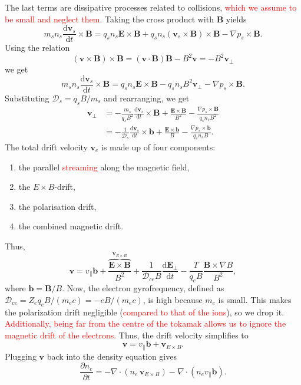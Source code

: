\documentclass[12pt]{article}
\begin{document}
%
The last terms are dissipative processes related to collisions, \textcolor{red}{which we assume to be small and neglect them}. Taking the cross product with $\bm{B}$ yields
%
\begin{equation}
    m_s n_s \frac{\mathrm{d} \bm{v}_s}{\mathrm{d} t} \times \bm{B} = q_s n_s \bm{E} \times \bm{B} + q_s n_s (\bm{v}_s \times \bm{B}) \times \bm{B} - \nabla p_s \times \bm{B} .
\end{equation}
%
Using the relation
%
\begin{equation}
    (\bm{v} \times \bm{B}) \times \bm{B} = (\bm{v} \cdot \bm{B}) \bm{B} - B^2 \bm{v} = - B^2 \bm{v}_\perp
\end{equation}
%
we get
%
\begin{equation}
    m_s n_s \frac{\mathrm{d} \bm{v}_s}{\mathrm{d} t} \times \bm{B} = q_s n_s \bm{E} \times \bm{B} - q_s n_s B^2 \bm{v}_\perp - \nabla p_s \times \bm{B} .
\end{equation}
%
Substituting $\mathcal{D}_s = q_s B / m_s$ and rearranging, we get
%
\begin{align}
    \bm{v}_\perp &= - \frac{m_s}{q_s B^2} \frac{\mathrm{d} \bm{v}_s}{\mathrm{d} t} \times \bm{B} + \frac{\bm{E} \times \bm{B}}{B^2} - \frac{\nabla p_s \times \bm{B}}{q_s n_s B^2} \\
    &= - \frac{1}{\mathcal{D}_s} \frac{\mathrm{d} \bm{v}_s}{\mathrm{d} t} \times \bm{b} + \frac{\bm{E} \times \bm{b}}{B} - \frac{\nabla p_s \times \bm{b}}{q_s n_s B} .
\end{align}
%
The total drift velocity $\bm{v}_e$ is made up of four components:
%
\begin{enumerate}
    \item the parallel \textcolor{red}{streaming} along the magnetic field,
    \item the $E \times B$-drift,
    \item the polarisation drift,
    \item the combined magnetic drift.
\end{enumerate}
%
Thus,
%
\begin{equation}
    \bm{v} = v_\parallel \bm{b} + \overbrace{\frac{\bm{E} \times \bm{B}}{B^2}}^{\bm{v}_{E \times B}} + \frac{1}{\mathcal{D}_{ce} B} \frac{\mathrm{d}\bm{E}_\perp}{\mathrm{d}t} - \frac{T}{q_e B} \frac{\bm{B} \times \nabla B}{B^2} ,
\end{equation}
%
where $\bm{b} = \bm{B} / B$. Now, the electron gyrofrequency, defined as $\mathcal{D}_{ce} = Z_e q_e B/(m_e c) = -e B/(m_e c)$, is high because $m_e$ is small. This makes the polarization drift negligible (\textcolor{red}{compared to that of the ions}), so we drop it. \textcolor{red}{Additionally, being far from the centre of the tokamak allows us to ignore the magnetic drift of the electrons.} Thus, the drift velocity simplifies to
%
\begin{equation}
    \bm{v} = v_\parallel \bm{b} + \bm{v}_{E \times B} .
\end{equation}
%
Plugging $\bm{v}$ back into the density equation gives
%
\begin{equation}
    \frac{\partial n_e}{\partial t} = - \nabla \cdot (n_e \, \bm{v}_{E \times B}) - \nabla \cdot (n_e v_\parallel \bm{b}) .
\end{equation}
\end{document}
